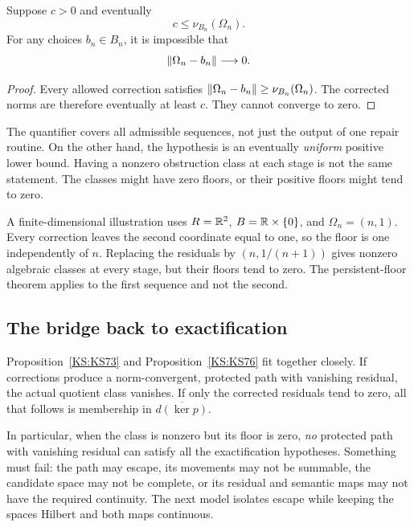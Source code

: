 \begin{KSproposition}\label{KS:KS77}
Suppose \(c>0\) and eventually
\[
 c\le\nu_{B_n}(\Omega_n).
\]
For any choices \(b_n\in B_n\), it is impossible that
\[
 \left\lVert\Omega_n-b_n\right\rVert\longrightarrow0.
\]
\end{KSproposition}
\begin{proof}
Every allowed correction satisfies
\(\left\lVert\Omega_n-b_n\right\rVert\ge\nu_{B_n}(\Omega_n)\). The corrected norms are therefore eventually at least \(c\). They cannot converge to zero.
\end{proof}
The quantifier covers all admissible sequences, not just the output of one repair routine. On the other hand, the hypothesis is an eventually \emph{uniform} positive lower bound. Having a nonzero obstruction class at each stage is not the same statement. The classes might have zero floors, or their positive floors might tend to zero.

A finite-dimensional illustration uses \(R=\mathbb R^2\), \(B=\mathbb R\times\{0\}\), and \(\Omega_n=(n,1)\). Every correction leaves the second coordinate equal to one, so the floor is one independently of \(n\). Replacing the residuals by \((n,1/(n+1))\) gives nonzero algebraic classes at every stage, but their floors tend to zero. The persistent-floor theorem applies to the first sequence and not the second.

\subsection{The bridge back to exactification}
Proposition~\ref{KS:KS73} and Proposition~\ref{KS:KS76} fit together closely. If corrections produce a norm-convergent, protected path with vanishing residual, the actual quotient class vanishes. If only the corrected residuals tend to zero, all that follows is membership in \(\overline{d(\ker p)}\).

In particular, when the class is nonzero but its floor is zero, \emph{no} protected path with vanishing residual can satisfy all the exactification hypotheses. Something must fail: the path may escape, its movements may not be summable, the candidate space may not be complete, or its residual and semantic maps may not have the required continuity. The next model isolates escape while keeping the spaces Hilbert and both maps continuous.




